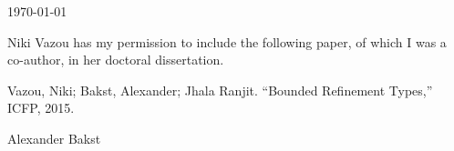 \documentclass{article}
\begin{document}
\today

Niki Vazou has my permission to include the following paper, of which
I was a co-author, in her doctoral dissertation.

Vazou, Niki; Bakst, Alexander; Jhala Ranjit.
``Bounded Refinement Types,'' ICFP, 2015.

\baselineskip
Alexander Bakst
\end{document}
